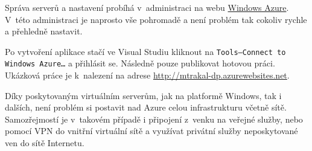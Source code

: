 Správa serverů a nastavení probíhá v~administraci na webu \href{https://manage.windowsazure.com}{Windows Azure\cite{azure:manage}}. V~této administraci je naprosto vše pohromadě a není problém tak cokoliv rychle a přehledně nastavit.

Po vytvoření aplikace stačí ve Visual Studiu kliknout na \texttt{Tools--Connect to Windows Azure\ldots} a přihlásit se. Následně pouze publikovat hotovou práci. Ukázková práce je k~nalezení na adrese \href{http://mtrakal-dp.azurewebsites.net}{http://mtrakal-dp.azurewebsites.net}.

Díky poskytovaným virtuálním serverům, jak na platformě Windows, tak i dalších, není problém si postavit nad Azure celou infrastrukturu včetně sítě. Samozřejmostí je v~takovém případě i připojení z~venku na veřejné služby, nebo pomocí VPN do vnitřní virtuální sítě a využívat privátní služby neposkytované ven do sítě Internetu.

